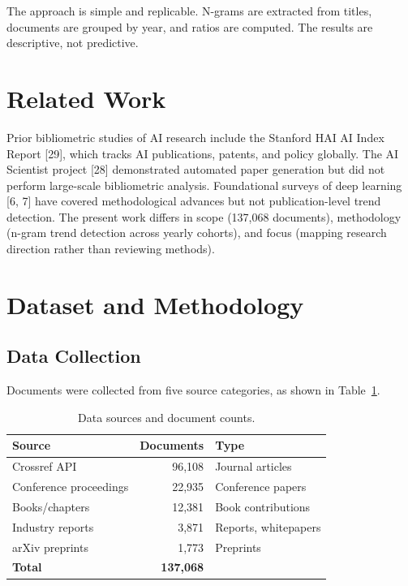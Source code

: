 \documentclass[11pt]{article}
\begin{document}
The approach is simple and replicable. N-grams are extracted from titles, documents are grouped by year, and ratios are computed. The results are descriptive, not predictive.

\section{Related Work}
\label{sec:related}

Prior bibliometric studies of AI research include the Stanford HAI AI Index Report [29], which tracks AI publications, patents, and policy globally. The AI Scientist project [28] demonstrated automated paper generation but did not perform large-scale bibliometric analysis. Foundational surveys of deep learning [6, 7] have covered methodological advances but not publication-level trend detection. The present work differs in scope (137,068 documents), methodology (n-gram trend detection across yearly cohorts), and focus (mapping research direction rather than reviewing methods).

\section{Dataset and Methodology}
\label{sec:method}

\subsection{Data Collection}

Documents were collected from five source categories, as shown in Table~\ref{tab:sources}.

\begin{table}[h]
\centering
\caption{Data sources and document counts.}
\label{tab:sources}
\begin{tabular}{@{}lrl@{}}
\toprule
Source & Documents & Type \\
\midrule
Crossref API & 96,108 & Journal articles \\
Conference proceedings & 22,935 & Conference papers \\
Books/chapters & 12,381 & Book contributions \\
Industry reports & 3,871 & Reports, whitepapers \\
arXiv preprints & 1,773 & Preprints \\
\midrule
\textbf{Total} & \textbf{137,068} & \\
\bottomrule
\end{tabular}
\end{table}
\end{document}
